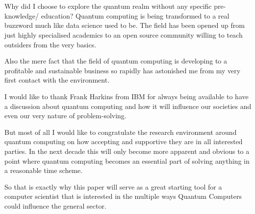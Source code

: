 
\chapter*{}
\label{ch:voorwoord}


Why did I choose to explore the quantum realm without any specific pre-knowledge/ education? Quantum computing is being transformed to a real buzzword much like data science used to be. The field has been opened up from just highly specialised academics to an open source community willing to teach outsiders from the very basics.

Also the mere fact that the field of quantum computing is developing to a profitable and sustainable business so rapidly has astonished me from my very first contact with the environment.

 I would like to thank Frank Harkins from IBM for always being available to have a discussion about quantum computing and how it will influence our societies and even our very nature of problem-solving. 
 
 But most of all I would like to congratulate the research environment around quantum computing on how accepting and supportive they are in all interested parties. In the next decade this will only become more apparent and obvious to a point where quantum computing becomes an essential part of solving anything in a reasonable time scheme.
 
 So that is exactly why this paper will serve as a great starting tool for a computer scientist that is interested in the multiple ways Quantum Computers could influence the general sector.
